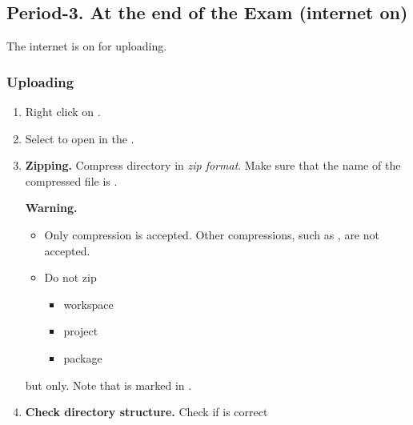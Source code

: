 \subsection{Period-3. At the end of the Exam (internet on)}

The internet is on for uploading.




\subsubsection{Uploading}
\label{sec:app:upload}

\begin{enumerate}[label=\roman*.]
	
	\item Right click on .

	\item Select  to open 
	 in the .

	\item \textbf{Zipping.}
	Compress  directory in \emph{zip format}. 
	Make sure that the name of the compressed file is .

	\textbf{Warning.}
	\begin{itemize}
		
		\item Only  compression is accepted. 
		Other compressions, such as , are not accepted.

		\item Do not zip
		\begin{itemize}[nosep] 

			\item workspace

			\item project

			\item package
			
		\end{itemize}
			
		\end{itemize}
		but  only.
		Note that  is marked in  .

	\item \textbf{Check directory structure.}
	Check if  is correct
	\begin{enumerate}
		

\end{enumerate}
\end{enumerate}
